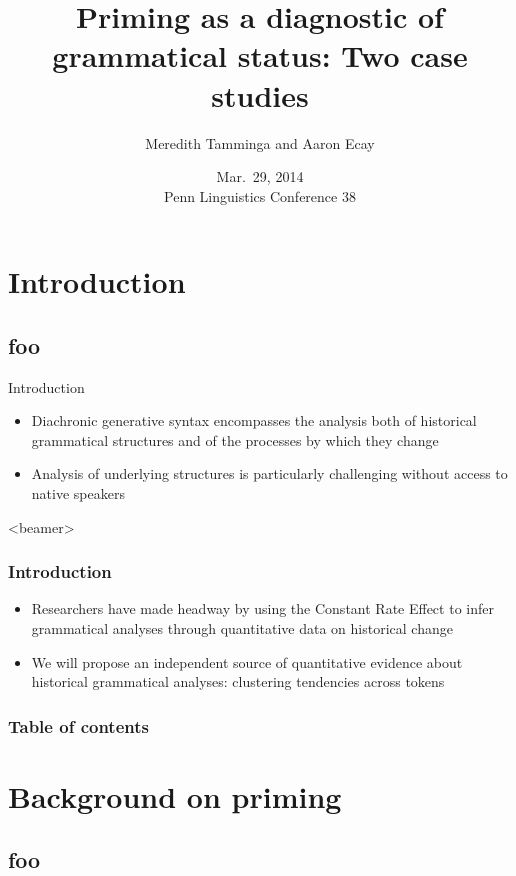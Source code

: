 \documentclass{digs-slides}
\title{Priming as a diagnostic of grammatical status: Two case studies}
\author{Meredith Tamminga and Aaron Ecay}
\institute{University of Pennsylvania}
\date{Mar.\ 29, 2014 \\\vspace{0.5em} Penn Linguistics Conference 38}
\begin{document}
\begin{frame}
    \titlepage
\end{frame}

\section*{Introduction}

\subsection*{foo}

\begin{frame}{Introduction}
    \begin{itemize}
      \item Diachronic generative syntax encompasses the analysis both
        of historical grammatical structures and of the processes by
        which they change
      \item Analysis of underlying structures is particularly challenging
        without access to native speakers
    \end{itemize}
\end{frame}

\begin{frame}<beamer>
    \frametitle{Introduction}
    \begin{itemize}
      \item Researchers have made headway by using the Constant Rate
        Effect \parencite{Kroch1989} to infer grammatical
        analyses through quantitative data on historical change
      \item We will propose an independent source of quantitative
        evidence about historical grammatical analyses: clustering
        tendencies across tokens
    \end{itemize}
\end{frame}

\begin{frame}
    \frametitle{Table of contents}
    \tableofcontents{}
\end{frame}

\section{Background on priming}

\subsection*{foo}
\end{document}
